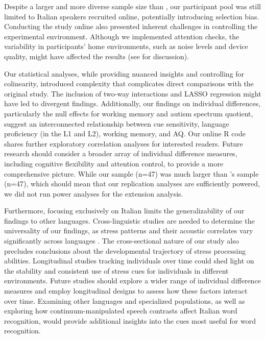 Despite a larger and more diverse sample size than \cite{Sulpizio_McQueen_2012}, our participant pool was still limited to Italian speakers recruited online, potentially introducing selection bias. Conducting the study online also presented inherent challenges in controlling the experimental environment. Although we implemented attention checks, the variability in participants' home environments, such as noise levels and device quality, might have affected the results (see \cite{bramlett_wiener_24-AOW} for discussion).

Our statistical analyses, while providing nuanced insights and controlling for colinearity, introduced complexity that complicates direct comparisons with the original study. The inclusion of two-way interactions and LASSO regression might have led to divergent findings. Additionally, our findings on individual differences, particularly the null effects for working memory and autism spectrum quotient, suggest an interconnected relationship between cue sensitivity, language proficiency (in the L1 and L2), working memory, and AQ. Our online R code shares further exploratory correlation analyses for interested readers. Future research should consider a broader array of individual difference measures, including cognitive flexibility and attention control, to provide a more comprehensive picture. While our sample (n=47) was much larger than \cite{Sulpizio_McQueen_2012}'s sample (n=47), which should mean that our replication analyses are sufficiently powered, we did not run power analyses for the extension analysis.

Furthermore, focusing exclusively on Italian limits the generalizability of our findings to other languages. Cross-linguistic studies are needed to determine the universality of our findings, as stress patterns and their acoustic correlates vary significantly across languages \cite{cutler2007dutch}. The cross-sectional nature of our study also precludes conclusions about the developmental trajectory of stress processing abilities. Longitudinal studies tracking individuals over time could shed light on the stability and consistent use of stress cues for individuals in different environments. Future studies should explore a wider range of individual difference measures and employ longitudinal designs to assess how these factors interact over time. Examining other languages and specialized populations, as well as exploring how continuum-manipulated speech contrasts affect Italian word recognition, would provide additional insights into the cues most useful for word recognition.

